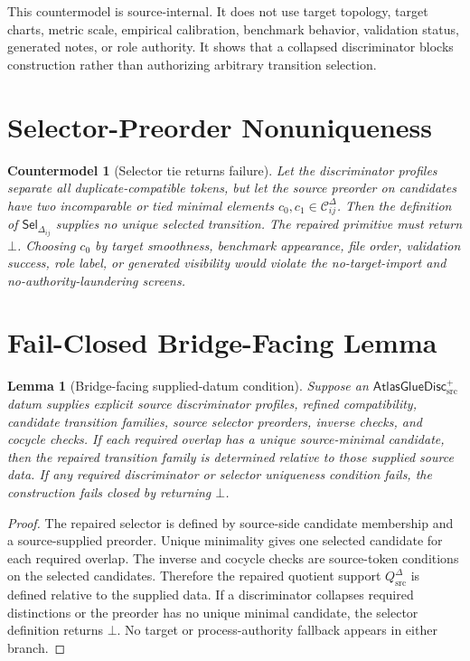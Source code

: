 \documentclass[11pt]{article}
\newcommand{\AtlasGlueDisc}{\mathsf{AtlasGlueDisc}_{\mathrm{src}}^{+}}
\newcommand{\Qdisc}{Q_{\mathrm{src}}^{\Delta}}
\newcommand{\Cand}{\mathcal{C}^{\Delta}}
\newcommand{\Sel}{\mathsf{Sel}_{\Delta}}
\newtheorem{countermodel}{Countermodel}
\newtheorem{lemma}{Lemma}
\begin{document}
This countermodel is source-internal. It does not use target topology, target
charts, metric scale, empirical calibration, benchmark behavior, validation
status, generated notes, or role authority. It shows that a collapsed
discriminator blocks construction rather than authorizing arbitrary
transition selection.

\section{Selector-Preorder Nonuniqueness}

\begin{countermodel}[Selector tie returns failure]
Let the discriminator profiles separate all duplicate-compatible tokens, but
let the source preorder on candidates have two incomparable or tied minimal
elements \(c_0,c_1\in\Cand_{ij}\). Then the definition of
\(\Sel_{ij}\) supplies no unique selected transition. The repaired primitive
must return \(\bot\). Choosing \(c_0\) by target smoothness, benchmark
appearance, file order, validation success, role label, or generated
visibility would violate the no-target-import and no-authority-laundering
screens.
\end{countermodel}

\section{Fail-Closed Bridge-Facing Lemma}

\begin{lemma}[Bridge-facing supplied-datum condition]
Suppose an \(\AtlasGlueDisc\) datum supplies explicit source discriminator
profiles, refined compatibility, candidate transition families, source
selector preorders, inverse checks, and cocycle checks. If each required
overlap has a unique source-minimal candidate, then the repaired transition
family is determined relative to those supplied source data. If any required
discriminator or selector uniqueness condition fails, the construction fails
closed by returning \(\bot\).
\end{lemma}

\begin{proof}
The repaired selector is defined by source-side candidate membership and a
source-supplied preorder. Unique minimality gives one selected candidate for
each required overlap. The inverse and cocycle checks are source-token
conditions on the selected candidates. Therefore the repaired quotient
support \(\Qdisc\) is defined relative to the supplied data. If a
discriminator collapses required distinctions or the preorder has no unique
minimal candidate, the selector definition returns \(\bot\). No target or
process-authority fallback appears in either branch.
\end{proof}
\end{document}

